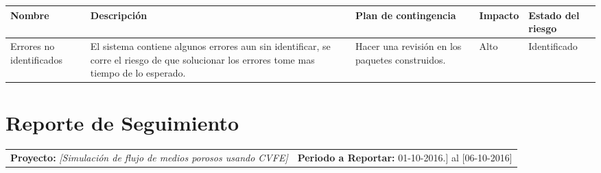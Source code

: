 \documentclass[12pt]{report}
\numberwithin{equation}{section}
\begin{document}
\begin{flushleft}
\begin{table}[H]
\begin{tabular}{|m{2cm}|m{4cm}|m{4.5cm}|m{1.5cm}|m{2cm}|}
\hline 
\textbf{Nombre } & \textbf{Descripci\'on} & \textbf{Plan de contingencia} & \textbf{Impacto} & \textbf{Estado del riesgo}  \\
\hline
\hline
\small{Errores no identificados} & \small{El sistema contiene algunos errores aun sin identificar, se corre el riesgo de que solucionar los errores tome mas tiempo de lo esperado.}& \small{Hacer una revisi\'on en los paquetes construidos.}  & \small{Alto} & \small{Identificado}\\
\hline
\end{tabular}
\label{tabla: TABLA CE de nuevos riesgos}
\end{table}

\end{flushleft}

\newpage

\centering \section{Reporte de Seguimiento} 


\begin{tabular}{m{7cm} m{8cm}}
\small{ \textbf{Proyecto:} \scriptsize{\textit{[Simulaci\'on de flujo de medios porosos usando CVFE]}}} & \small{\textbf{Periodo a Reportar:} \scriptsize{01-10-2016.] al [06-10-2016]}}
\end{tabular}
\end{document}
